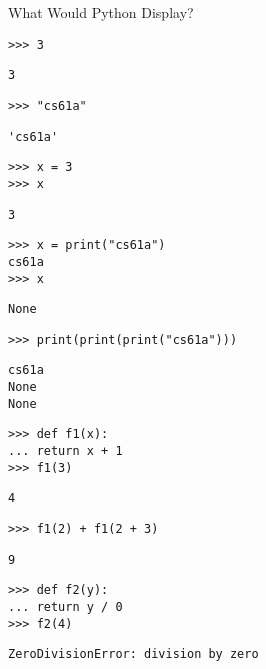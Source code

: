 \question What Would Python Display?

\begin{lstlisting}
>>> 3
\end{lstlisting}
\begin{solution}[.2in]
\lstinline{3}
\end{solution}

\begin{lstlisting}
>>> "cs61a"
\end{lstlisting}
\begin{solution}[.2in]
    \lstinline{'cs61a'}
\end{solution}

\begin{lstlisting}
>>> x = 3
>>> x
\end{lstlisting}
\begin{solution}[.2in]
    \lstinline{3}
\end{solution}

\begin{lstlisting}
>>> x = print("cs61a")
cs61a
>>> x
\end{lstlisting}
\begin{solution}[.2in]
    \lstinline{None}
\end{solution}

\begin{lstlisting}
>>> print(print(print("cs61a")))
\end{lstlisting}
\begin{solution}[.6in]
\begin{lstlisting}
cs61a 
None 
None
\end{lstlisting}
\end{solution}

\begin{lstlisting}
>>> def f1(x):
...	return x + 1
>>> f1(3)
\end{lstlisting}
\begin{solution}[.2in]
    \lstinline{4}
\end{solution}

\begin{lstlisting}
>>> f1(2) + f1(2 + 3)
\end{lstlisting}
\begin{solution}[.2in]
    \lstinline{9}
\end{solution}

\begin{lstlisting}
>>> def f2(y):
...	return y / 0
>>> f2(4)
\end{lstlisting}
\begin{solution}[.2in]
    \lstinline{ZeroDivisionError: division by zero}
\end{solution}

